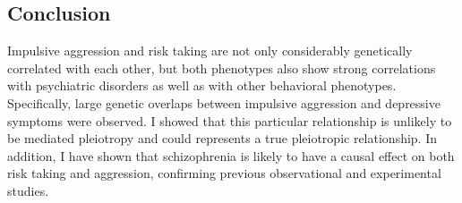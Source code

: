 \subsection{Conclusion}
\label{sub:conclusion_psych}

Impulsive aggression and risk taking are not only considerably genetically correlated with  each other, but both phenotypes also show strong correlations with psychiatric disorders as well as with other behavioral phenotypes.
Specifically, large genetic overlaps between impulsive aggression and depressive symptoms were observed.
I showed that this particular relationship is unlikely to be mediated pleiotropy and could represents a true pleiotropic relationship.
In addition, I have shown that schizophrenia is likely to have a causal effect on both risk taking and aggression,
confirming previous observational and experimental studies.

